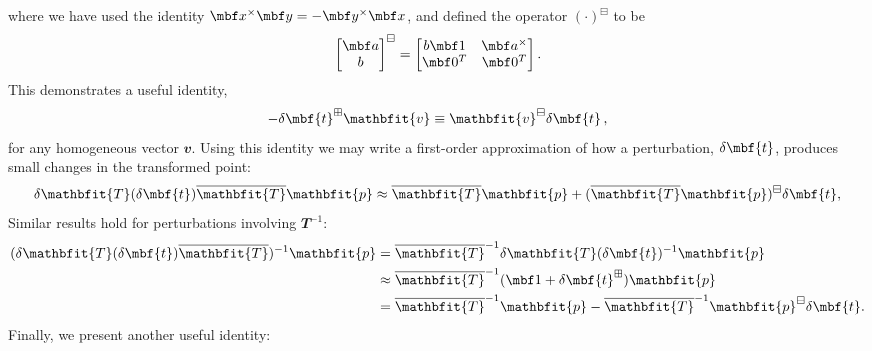 \documentclass[11pt,letterpaper,fleqn,oneside]{article}
\newcommand{\bbm}{\begin{bmatrix}}
\newcommand{\ebm}{\end{bmatrix}}
\newcommand{\mbfdel}[1]{{\delta{\mbf{#1}}}}
\newcommand{\homo}[1]{{\mathbfit{#1}}}
\newcommand{\mbfhbar}[1]{{\overline{\homo{#1}}}}
\newcommand{\mbfhdel}[1]{{\delta{\homo{#1}}}}
\newcommand{\mbfh}[1]{{\homo{#1}}}
\begin{document}
where we have used the identity $\mbf x^\times \mbf y = - \mbf y^\times \mbf x$, and defined the operator $(\cdot)^\boxminus$ to be
\begin{equation}
	 \bbm \mbf a\\ b \ebm^\boxminus = 
		\bbm
			  b\mbf 1   & \mbf a^\times\\
			  \mbf 0^T & \mbf 0^T    
		\ebm.
\end{equation}
This demonstrates a useful identity,
\begin{equation}
	-\mbfdel t^\boxplus \mbfh v \equiv \mbfh v^\boxminus \mbfdel t\,,
\end{equation}
for any homogeneous vector $\mbfh v$.
Using this identity we may write a first-order approximation of how a perturbation, $\mbfdel t$, produces small changes in the transformed point:
\begin{equation}
	\mbfhdel T(\mbfdel t) \mbfhbar T \mbfh p \approx \mbfhbar T \mbfh p +
			(\mbfhbar T \mbfh p)^\boxminus
			\mbfdel t, \label{eq:linTx}
\end{equation}
Similar results hold for perturbations involving $\mbfh T^{-1}$:
\begin{subequations}
	\begin{flalign}
		(\mbfhdel T(\mbfdel t) \mbfhbar T)^{-1} \mbfh p  & = \mbfhbar T^{-1}\mbfhdel T(\mbfdel t)^{-1}\mbfh p\\
		&\approx \mbfhbar T^{-1}(\mbf 1 + \mbfdel t^\boxplus)\mbfh p\\
   		&= \mbfhbar T^{-1}\mbfh p - \mbfhbar T^{-1}\mbfh p^\boxminus\mbfdel t.
	\end{flalign}
\end{subequations}
Finally, we present another useful identity:
\end{document}
